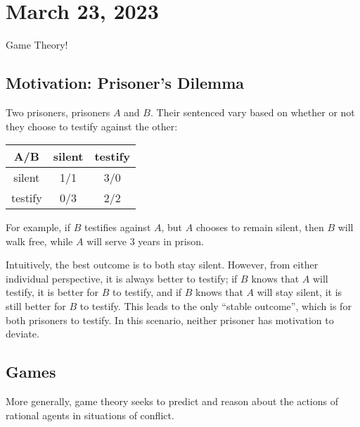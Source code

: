 \section{March 23, 2023}

Game Theory!

\subsection{Motivation: Prisoner's Dilemma}

Two prisoners, prisoners $A$ and $B$. Their sentenced vary based on whether or not they choose to testify against the other:

\begin{center}
    \begin{tabular}{c|c|c|}
A/B & silent & testify \\
\hline
    silent & 1/1 & 3/0 \\
\hline
    testify & 0/3 & 2/2 \\
\hline
\end{tabular}
\end{center}

For example, if $B$ testifies against $A$, but $A$ chooses to remain silent, then $B$ will walk free, while $A$ will serve $3$ years in prison. 

Intuitively, the best outcome is to both stay silent. However, from either individual perspective, it is always better to testify; if $B$ knows that $A$ will testify, it is better for $B$ to testify, and if $B$ knows that $A$ will stay silent, it is still better for $B$ to testify. This leads to the only ``stable outcome'', which is for both prisoners to testify. In this scenario, neither prisoner has motivation to deviate. 

\subsection{Games}

More generally, game theory seeks to predict and reason about the actions of rational agents in situations of conflict. 

